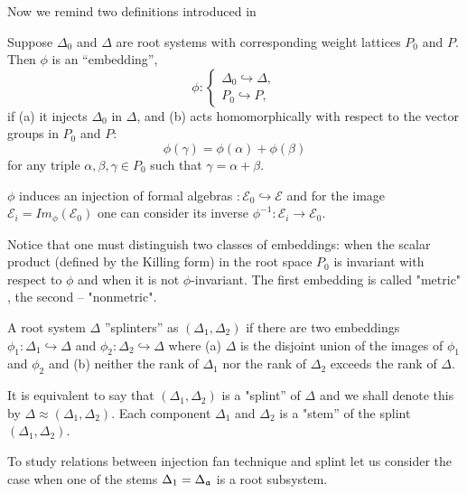 Now we remind two definitions introduced in \cite{richter2008splints}

\begin{Def}
Suppose $\Delta _{0}$ and $\Delta $ are root systems with corresponding
weight lattices $P_{0}$ and $P$. Then $\phi $ is an ``embedding'',
\begin{equation}
\phi :\left\{
\begin{array}{l}
\Delta _{0}\hookrightarrow \Delta , \\
P_{0}\hookrightarrow P,
\end{array}
\right.
\end{equation}
if \newline
\noindent (a) it injects $\Delta _{0}$ in $\Delta $, and \newline
\noindent (b) acts homomorphically with respect to the vector groups in $%
P_{0}$ and $P$:
\[
\phi (\gamma )=\phi (\alpha )+\phi (\beta )
\]
for any triple $\alpha ,\beta ,\gamma \in P_{0}$ such that $\gamma =\alpha
+\beta $.
\end{Def}

$\phi$ induces an injection of formal algebras $:{\mathcal{E}}_0
\hookrightarrow \mathcal{E}$ and for the image ${\mathcal{E}}%
_i=Im_{\phi}\left( {\mathcal{E}}_0\right)$ one can consider its inverse $%
\phi^{-1}:{\mathcal{E}}_i \longrightarrow {\mathcal{E}}_0$.

Notice that one must distinguish two classes of embeddings: when the scalar
product (defined by the Killing form) in the root space $P_0$ is invariant
with respect to $\phi$ and when it is not $\phi$-invariant. The first
embedding is called "metric" , the second -- "nonmetric".

\begin{Def}
A root system $\Delta $ ''splinters'' as $(\Delta _{1},\Delta _{2})$ if
there are two embeddings $\phi _{1}:\Delta _{1}\hookrightarrow \Delta $ and $%
\phi _{2}:\Delta _{2}\hookrightarrow \Delta $ where (a) $\Delta $ is the
disjoint union of the images of $\phi _{1}$ and $\phi _{2}$ and (b) neither
the rank of $\Delta _{1}$ nor the rank of $\Delta _{2}$ exceeds the rank of $%
\Delta $.
\end{Def}

It is equivalent to say that $(\Delta_1,\Delta_2)$ is a "splint'' of $\Delta$
and we shall denote this by $\Delta \approx (\Delta_1,\Delta_2)$. Each
component $\Delta_1$ and $\Delta_2$ is a "stem'' of the splint $%
(\Delta_1,\Delta_2)$.

To study relations between injection fan technique and splint let us 
consider the case when one of the stems $\Delta _{1}=\Delta _{\frak{a}}$ 
is a root subsystem.

